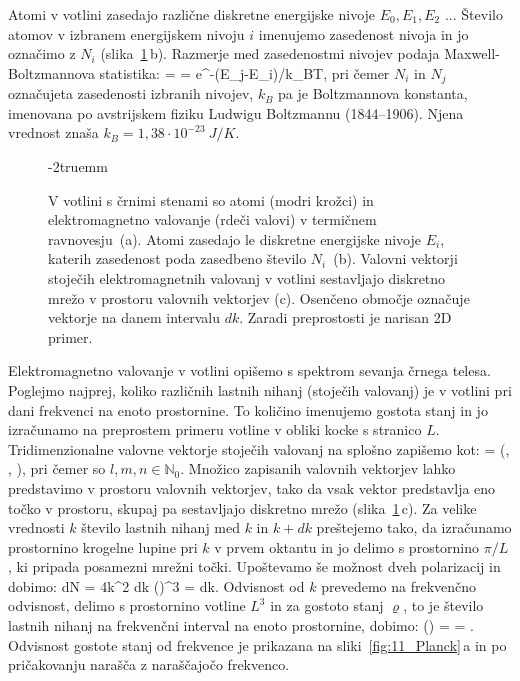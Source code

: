 Atomi v votlini zasedajo različne diskretne energijske nivoje
$E_0, E_1, E_2$ ... Število atomov v izbranem
energijskem nivoju $i$ imenujemo zasedenost nivoja in 
jo označimo z $N_i$ (slika~\ref{fig:11_votlina}\,b).
Razmerje med zasedenostmi nivojev podaja
Maxwell-Boltzmannova statistika:
\beq
{} =  = e^{-(E_j-E_i)/k_BT},
\label{eq:11_01}
\eeq
pri čemer $N_i$ in $N_j$ označujeta zasedenosti izbranih nivojev, $k_B$ pa je 
Boltzmannova konstanta, imenovana po avstrijskem
fiziku Ludwigu Boltzmannu (1844--1906). Njena vrednost znaša 
$k_B = 1,38 \cdot 10^{-23}~\si{J/K}$.
\begin{figure}[h!]
\centering
\def\svgwidth{130truemm} 

\caption{V votlini s črnimi stenami so atomi (modri krožci) in 
elektromagnetno valovanje (rdeči valovi) v termičnem ravnovesju~(a). 
Atomi zasedajo le diskretne
energijske nivoje $E_i$, katerih zasedenost poda zasedbeno 
število $N_i$~(b). Valovni vektorji stoječih elektromagnetnih 
valovanj v votlini sestavljajo diskretno mrežo v prostoru valovnih vektorjev (c).
Osenčeno območje označuje vektorje na danem intervalu $dk$. Zaradi
preprostosti je narisan 2D primer. 
}
\label{fig:11_votlina}
\vglue-2truemm
\end{figure}

Elektromagnetno valovanje v votlini opišemo s spektrom sevanja
črnega telesa. Poglejmo najprej, koliko različnih lastnih nihanj
(stoječih valovanj) je v votlini pri dani frekvenci na enoto prostornine.
To količino imenujemo gostota stanj in jo izračunamo na preprostem primeru
votline v obliki kocke s stranico $L$. 
Tridimenzionalne valovne vektorje stoječih valovanj na splošno zapišemo kot:
\beq
{} = \left(, , \right)\!\!,
\label{eq:11_04}
\eeq
pri čemer so $l,m,n \in \mathbb{N}_0$. Množico zapisanih valovnih vektorjev
lahko predstavimo v prostoru valovnih vektorjev, tako da
vsak vektor predstavlja eno točko v prostoru, skupaj 
pa sestavljajo diskretno mrežo (slika~\ref{fig:11_votlina}\,c). 
Za velike vrednosti $k$ število lastnih nihanj 
med $k$ in $k+dk$ preštejemo tako, da izračunamo prostornino krogelne 
lupine pri $k$ v prvem oktantu in jo delimo s prostornino $\pi/L$, 
ki pripada posamezni  mrežni točki. Upoštevamo še možnost dveh polarizacij 
in dobimo:
\beq
dN = 4\pi k^2 dk \left(\right)^3 = dk.
\label{eq:11_05}
\eeq
Odvisnost od $k$ prevedemo na frekvenčno odvisnost, delimo s prostornino votline $L^3$
in za gostoto stanj $\varrho$, to je število lastnih nihanj na frekvenčni interval
na enoto prostornine, dobimo:
\beq
\varrho (\omega) =  = .
\label{eq:11_06}
\eeq
Odvisnost gostote stanj od frekvence je prikazana na sliki~\ref{fig:11_Planck}\,a in po 
pričakovanju narašča z naraščajočo frekvenco. 

